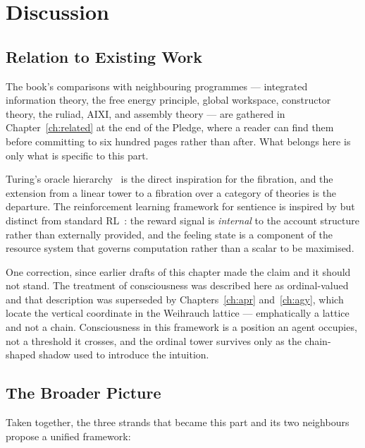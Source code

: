\chapter{Discussion}
\label{sec:hyper-discussion}

\section{Relation to Existing Work}

The book's comparisons with neighbouring programmes --- integrated
information theory, the free energy principle, global workspace,
constructor theory, the ruliad, AIXI, and assembly theory --- are
gathered in Chapter~\ref{ch:related} at the end of the Pledge, where a
reader can find them before committing to six hundred pages rather than
after.
What belongs here is only what is specific to this part.

Turing's oracle hierarchy~\cite{turing1939} is the direct inspiration
for the fibration, and the extension from a linear tower to a fibration
over a category of theories is the departure.
The reinforcement learning framework for sentience is inspired by but
distinct from standard RL~\cite{sutton2018reinforcement}: the reward
signal is \emph{internal} to the account structure rather than
externally provided, and the feeling state is a component of the
resource system that governs computation rather than a scalar to be
maximised.

One correction, since earlier drafts of this chapter made the claim and
it should not stand.
The treatment of consciousness was described here as ordinal-valued and
that description was superseded by Chapters~\ref{ch:apr}
and~\ref{ch:agy}, which locate the vertical coordinate in the Weihrauch
lattice --- emphatically a lattice and not a chain.
Consciousness in this framework is a position an agent occupies, not a
threshold it crosses, and the ordinal tower survives only as the
chain-shaped shadow used to introduce the intuition.

\section{The Broader Picture}

Taken together, the three strands that became this part and its two
neighbours propose a unified framework:


